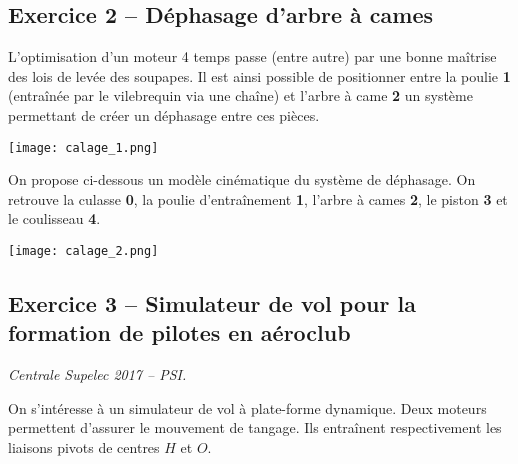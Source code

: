 \newpage

\subsection*{Exercice 2 -- Déphasage d'arbre à cames}



L'optimisation d'un moteur 4 temps passe (entre autre) par une bonne maîtrise des lois de levée des soupapes. Il est ainsi possible de positionner entre la poulie \textbf{1} (entraînée par le vilebrequin via une chaîne) et l'arbre à came  \textbf{2} un système permettant de créer un déphasage entre ces pièces. 

\begin{marginfigure}
\texttt{[image: calage\_1.png]}
\end{marginfigure}

On propose ci-dessous un modèle cinématique du système de déphasage. On retrouve la culasse \textbf{0}, la poulie d’entraînement \textbf{1}, l'arbre à cames \textbf{2}, le piston \textbf{3} et le coulisseau \textbf{4}. 


\begin{center}
\texttt{[image: calage\_2.png]}
\end{center}

\ifprof
\begin{corrige}
\end{corrige}\else\fi

\ifprof
\begin{corrige}
\end{corrige}\else\fi

\subsection*{Exercice 3 -- Simulateur de vol pour la formation de pilotes en aéroclub}


\begin{flushright}
\textit{Centrale Supelec 2017 -- PSI.}
\end{flushright}
On s’intéresse à un simulateur de vol à plate-forme dynamique. 
%
Deux moteurs permettent d'assurer le mouvement de tangage.  Ils entraînent respectivement les liaisons pivots de centres $H$ et $O$. 

